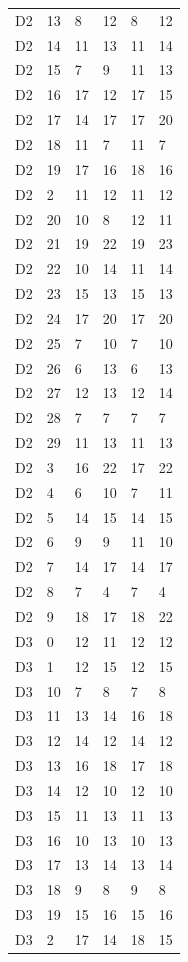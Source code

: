\begin{longtable}{llllll}
D2 & 13 & 8 & 12 & 8 & 12 \\
D2 & 14 & 11 & 13 & 11 & 14 \\
D2 & 15 & 7 & 9 & 11 & 13 \\
D2 & 16 & 17 & 12 & 17 & 15 \\
D2 & 17 & 14 & 17 & 17 & 20 \\
D2 & 18 & 11 & 7 & 11 & 7 \\
D2 & 19 & 17 & 16 & 18 & 16 \\
D2 & 2 & 11 & 12 & 11 & 12 \\
D2 & 20 & 10 & 8 & 12 & 11 \\
D2 & 21 & 19 & 22 & 19 & 23 \\
D2 & 22 & 10 & 14 & 11 & 14 \\
D2 & 23 & 15 & 13 & 15 & 13 \\
D2 & 24 & 17 & 20 & 17 & 20 \\
D2 & 25 & 7 & 10 & 7 & 10 \\
D2 & 26 & 6 & 13 & 6 & 13 \\
D2 & 27 & 12 & 13 & 12 & 14 \\
D2 & 28 & 7 & 7 & 7 & 7 \\
D2 & 29 & 11 & 13 & 11 & 13 \\
D2 & 3 & 16 & 22 & 17 & 22 \\
D2 & 4 & 6 & 10 & 7 & 11 \\
D2 & 5 & 14 & 15 & 14 & 15 \\
D2 & 6 & 9 & 9 & 11 & 10 \\
D2 & 7 & 14 & 17 & 14 & 17 \\
D2 & 8 & 7 & 4 & 7 & 4 \\
D2 & 9 & 18 & 17 & 18 & 22 \\
D3 & 0 & 12 & 11 & 12 & 12 \\
D3 & 1 & 12 & 15 & 12 & 15 \\
D3 & 10 & 7 & 8 & 7 & 8 \\
D3 & 11 & 13 & 14 & 16 & 18 \\
D3 & 12 & 14 & 12 & 14 & 12 \\
D3 & 13 & 16 & 18 & 17 & 18 \\
D3 & 14 & 12 & 10 & 12 & 10 \\
D3 & 15 & 11 & 13 & 11 & 13 \\
D3 & 16 & 10 & 13 & 10 & 13 \\
D3 & 17 & 13 & 14 & 13 & 14 \\
D3 & 18 & 9 & 8 & 9 & 8 \\
D3 & 19 & 15 & 16 & 15 & 16 \\
D3 & 2 & 17 & 14 & 18 & 15 \\

\end{longtable}
